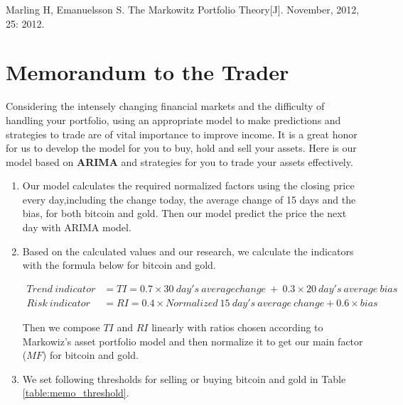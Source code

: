 \documentclass[12pt,a4paper]{article}
\newcommand{\Predictor}{ARIMA }
\begin{document}
\begin{spacing}{1.2}
\begin{thebibliography}{00}
Marling H, Emanuelsson S. The Markowitz Portfolio Theory[J]. November, 2012, 25: 2012.


\end{thebibliography}


\addtocounter{page}{-1}
\thispagestyle{empty}

\newpage
\addtocounter{page}{-1}
\thispagestyle{empty}

{\centering\section*{Memorandum to the Trader}}

Considering the intensely changing financial markets and the difficulty of handling your portfolio, using an appropriate model to make predictions and strategies to trade are of vital importance to improve income. It is a great honor for us to develop the model for you to buy, hold and sell your assets. Here is our model based on \textbf{\Predictor} and strategies for you to trade your assets effectively.  
	
\begin{enumerate}
	\item Our model calculates the required normalized factors using the closing price every day,including the change today, the average change of 15 days and the bias, for both bitcoin and gold. Then our model predict the price the next day with ARIMA model.
	 
	\item Based on the calculated values and our research, we calculate the indicators with the formula below for bitcoin and gold. 
	

\begin{align*}
	Trend \ indicator &= TI = 0.7 \times 30 \ day's \ average change \ + \ 0.3 \times 20 \ day's \ average \ bias \\
	Risk \ indicator &= RI = 0.4 \times Normalized \ 15 \ day's \ average \ change + 0.6 \times bias
\end{align*}
	
	Then we compose $TI$ and $RI$ linearly with ratios chosen according to Markowiz's asset portfolio model and then normalize it to get our main factor ($MF$) for bitcoin and gold. 
	
	\item We set following thresholds for selling or buying bitcoin and gold in Table \ref{table:memo_threshold}.
	

\end{enumerate}
\end{spacing}
\end{document}
